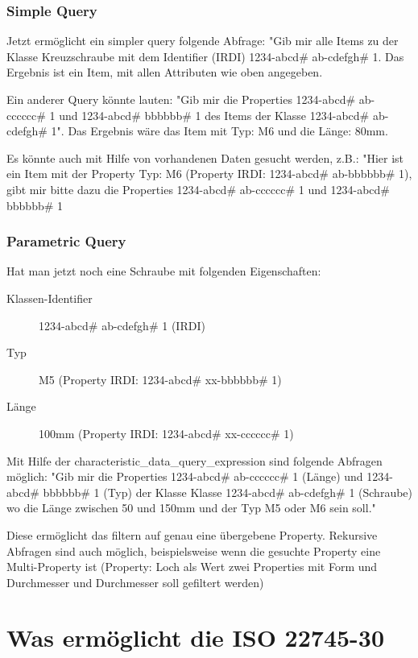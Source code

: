 \subsubsection{Simple Query}

Jetzt ermöglicht ein simpler query folgende Abfrage: "Gib mir alle Items zu der Klasse Kreuzschraube mit dem Identifier (IRDI) 1234-abcd\# ab-cdefgh\# 1. Das Ergebnis ist ein Item, mit allen Attributen wie oben angegeben. 

Ein anderer Query könnte lauten: "Gib mir die Properties 1234-abcd\# ab-cccccc\# 1 und 1234-abcd\# bbbbbb\# 1 des Items der Klasse 1234-abcd\# ab-cdefgh\# 1". Das Ergebnis wäre das Item mit Typ: M6 und die Länge: 80mm.

Es könnte auch mit Hilfe von vorhandenen Daten gesucht werden, z.B.: "Hier ist ein Item mit der Property Typ: M6 (Property IRDI: 1234-abcd\# ab-bbbbbb\# 1), gibt mir bitte dazu die Properties 1234-abcd\# ab-cccccc\# 1 und 1234-abcd\# bbbbbb\# 1 

\subsubsection{Parametric Query}

Hat man jetzt noch eine Schraube mit folgenden Eigenschaften:
\begin{description}
\item[Klassen-Identifier] 1234-abcd\# ab-cdefgh\# 1 (IRDI)
\item[Typ] M5 (Property IRDI: 1234-abcd\# xx-bbbbbb\# 1)
\item[Länge] 100mm (Property IRDI: 1234-abcd\# xx-cccccc\# 1)
\end{description}


Mit Hilfe der characteristic\_data\_query\_expression sind folgende Abfragen möglich: "Gib mir die Properties 1234-abcd\# ab-cccccc\# 1 (Länge) und 1234-abcd\# bbbbbb\# 1 (Typ) der Klasse Klasse 1234-abcd\# ab-cdefgh\# 1 (Schraube) wo die Länge zwischen 50 und 150mm und der Typ M5 oder M6 sein soll."


Diese ermöglicht das filtern auf genau eine übergebene Property. Rekursive Abfragen sind auch möglich, beispielsweise wenn die gesuchte Property eine Multi-Property ist (Property: Loch als Wert zwei Properties mit Form und Durchmesser und Durchmesser soll gefiltert werden)

\section{Was ermöglicht die ISO 22745-30}

